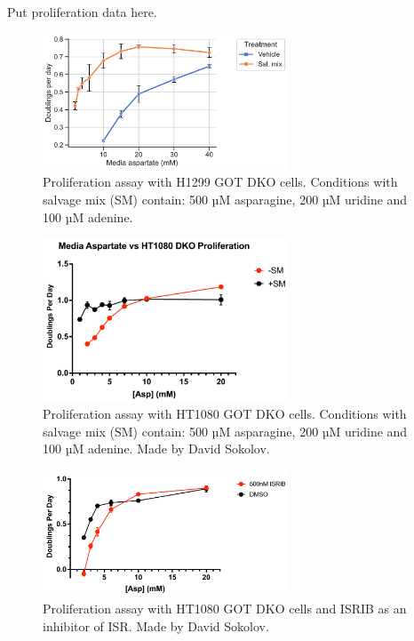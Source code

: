 Put proliferation data here.




\begin{figure}[ht]
    \centering
    \includegraphics[width=0.65\textwidth]{figures/sapp/tRNA/H1299_GOT-DKO_prlfr.pdf}
    \caption[Asp titration in H1299 GOT DKO]{
    Proliferation assay with H1299 GOT DKO cells.
    Conditions with salvage mix (SM) contain: 500 µM asparagine, 200 µM uridine and 100 µM adenine.
    }
    \label{fig:sapp:ISR:H1299_DKO_prlfr}
\end{figure}


\begin{figure}[ht]
    \centering
    \includegraphics[width=0.65\textwidth]{figures/sapp/tRNA/HT1080_GOT-DKO_prlfr.pdf}
    \caption[Asp titration in H1080 GOT DKO]{
    Proliferation assay with HT1080 GOT DKO cells.
    Conditions with salvage mix (SM) contain: 500 µM asparagine, 200 µM uridine and 100 µM adenine.
    Made by David Sokolov.
    }
    \label{fig:sapp:ISR:HT1080_DKO_prlfr}
\end{figure}



\begin{figure}[ht]
    \centering
    \includegraphics[width=0.65\textwidth]{figures/sapp/ISR/ISRIB-Exp2.pdf}
    \caption[Effect of ISR inhibition on HT1080 GOT DKO]{
    Proliferation assay with HT1080 GOT DKO cells and ISRIB as an inhibitor of ISR.
    Made by David Sokolov.
    }
    \label{fig:sapp:ISR:HT1080_DKO_ISRIB}
\end{figure}





